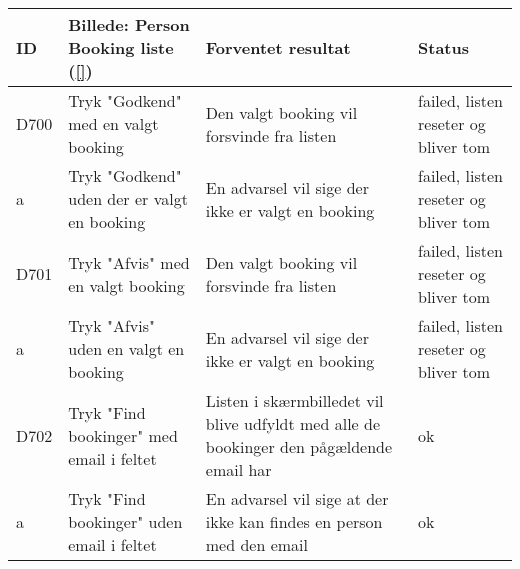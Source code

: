 \begin{tabular}{ |p{1cm}| p{5cm} | p{4cm} | p{1cm} | }
\hline
ID & Billede: Person Booking liste (\ref{})   & Forventet resultat & Status\\ 
\hline
D700 & Tryk "Godkend" med en valgt booking & Den valgt booking vil forsvinde fra listen & failed, listen reseter og bliver tom \\
\hline
a & Tryk "Godkend" uden der er valgt en booking & En advarsel vil sige der ikke er valgt en booking & failed, listen reseter og bliver tom \\
\hline
D701 & Tryk "Afvis" med en valgt booking & Den valgt booking vil forsvinde fra listen & failed, listen reseter og bliver tom \\
\hline
a & Tryk "Afvis" uden en valgt en booking & En advarsel vil sige der ikke er valgt en booking & failed, listen reseter og bliver tom\\
\hline
D702 & Tryk "Find bookinger" med email i feltet & Listen i skærmbilledet vil blive udfyldt med alle de bookinger den pågældende email har & ok \\
\hline 
a & Tryk "Find bookinger" uden email i feltet & En advarsel vil sige at der ikke kan findes en person med den email & ok \\
\hline
\end{tabular}

